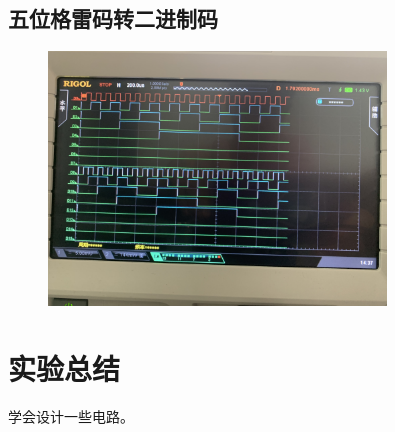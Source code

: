 \documentclass[UTF8, a4paper, 11pt]{article}
\begin{document}
\subsection{五位格雷码转二进制码}
\begin{figure}[H]
    \centering
    \includegraphics[width=0.8\textwidth]{G2Q.JPG}
\end{figure}
\section{实验总结}
学会设计一些电路。
%
%
\end{document}
